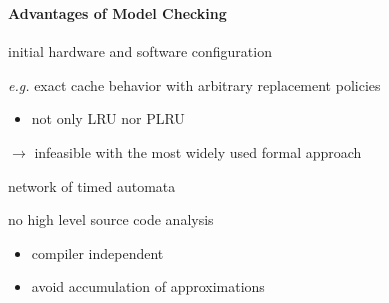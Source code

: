 \documentclass[usenames,dvipsnames]{beamer}
\begin{document}
  \begin{frame}
    \frametitle{\subsecname}
    \framesubtitle{Advantages of Model Checking}
    \small
    
    \begin{description}
      \item[witness] initial hardware and software configuration
      \item[tightness] \emph{e.g.} exact cache behavior with arbitrary replacement policies%
        \begin{itemize} %
          \item not only LRU nor PLRU
        \end{itemize}          
    \end{description}

    \vspace{1em}
    $\rightarrow$ infeasible with the most widely used formal approach

    \vspace{1em}
    \begin{description}
      \item[modularity] network of timed automata
      \item[binary level] no high level source code analysis
        \begin{itemize}
          \item compiler independent
          \item avoid accumulation of approximations
        \end{itemize}            
    \end{description}
  \end{frame}
  
\end{document}
